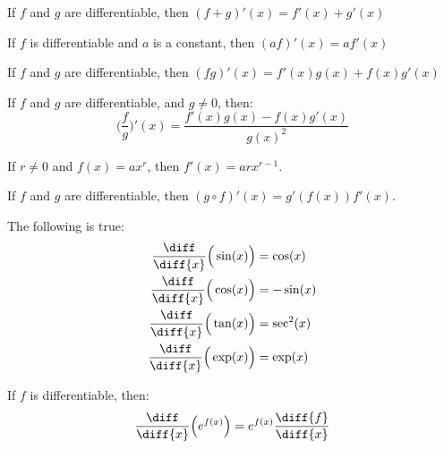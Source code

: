 \documentclass[crop=false,class=book,oneside]{standalone}
\begin{document}
        \begin{theorem}
            If $f$ and $g$ are differentiable, then
            $(f+g)'(x)=f'(x)+g'(x)$
        \end{theorem}
        \begin{theorem}
            If $f$ is differentiable and $a$ is a constant,
            then $(af)'(x)=af'(x)$
        \end{theorem}
        \begin{theorem}
            If $f$ and $g$ are differentiable, then
            $(fg)'(x)=f'(x)g(x)+f(x)g'(x)$
        \end{theorem}
        \begin{theorem}
            If $f$ and $g$ are differentiable, and $g\ne{0}$,
            then:
            \begin{equation*}
                \Big(\frac{f}{g}\Big)'(x)
                =\frac{f'(x)g(x)-f(x)g'(x)}{g(x)^{2}}
            \end{equation*}
        \end{theorem}
        \begin{theorem}
            If $r\ne{0}$ and $f(x)=ax^{r}$, then
            $f'(x)=arx^{r-1}$.
        \end{theorem}
        \begin{theorem}
            If $f$ and $g$ are differentiable, then
            $(g\circ{f})'(x)=g'(f(x))f'(x)$.
        \end{theorem}
        \begin{theorem}
            The following is true:
            \begin{align}
                \frac{\diff}{\diff{x}}\Big(\sin(x)\Big)
                &=\cos(x)\\
                \frac{\diff}{\diff{x}}\Big(\cos(x)\Big)
                &=-\sin(x)\\
                \frac{\diff}{\diff{x}}\Big(\tan(x)\Big)
                &=\sec^{2}(x)\\
                \frac{\diff}{\diff{x}}\Big(\exp(x)\Big)
                &=\exp(x)
            \end{align}
        \end{theorem}
        \begin{theorem}
            If $f$ is differentiable, then:
            \begin{equation*}
                \frac{\diff}{\diff{x}}\Big(e^{f(x)}\Big)
                =e^{f(x)}\frac{\diff{f}}{\diff{x}}
            \end{equation*}
        \end{theorem}
\end{document}

